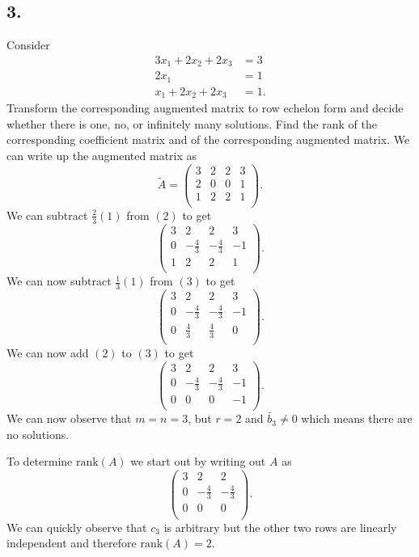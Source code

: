 \subsection*{3.}
Consider
\begin{align*}
  3x_1 + 2x_2 + 2x_3 &= 3 \\
  2x_1 &= 1 \\
  x_1 + 2x_2 + 2x_3 &= 1
.\end{align*}
Transform the corresponding augmented matrix to row echelon form and decide whether there is one, no, or infinitely many solutions. Find the rank of the corresponding coefficient matrix and of the corresponding augmented matrix.
\bigbreak
We can write up the augmented matrix as
\[ 
\tilde{A} = \left( \begin{array}{ccc|c}
3 & 2 & 2 & 3\\
2 & 0 & 0 & 1\\
1 & 2 & 2 & 1\\
\end{array} \right)
.\]
We can subtract $\frac{2}{3}(1)$ from $(2)$ to get
\[ 
\left( \begin{array}{ccc|c}
3 & 2 & 2 & 3\\
0 & -\frac{4}{3} & -\frac{4}{3} & -1\\
1 & 2 & 2 & 1\\
\end{array} \right)
.\]
We can now subtract $\frac{1}{3}(1)$ from $(3)$ to get
\[ 
\left( \begin{array}{ccc|c}
3 & 2 & 2 & 3\\
0 & -\frac{4}{3} & -\frac{4}{3} & -1\\
0 & \frac{4}{3} & \frac{4}{3} & 0\\
\end{array} \right)
.\]
We can now add $(2)$ to $(3)$ to get
\[ 
\left( \begin{array}{ccc|c}
3 & 2 & 2 & 3\\
0 & -\frac{4}{3} & -\frac{4}{3} & -1\\
0 & 0 & 0 & -1\\
\end{array} \right)
.\]
We can now observe that $m = n = 3$, but $r = 2$ and $\tilde{b_3} \neq 0$ which means there are no solutions.

To determine $\mathrm{rank}(A)$ we start out by writing out $A$ as
\[ 
  \begin{pmatrix}
  3 & 2 & 2\\
  0 & -\frac{4}{3} & -\frac{4}{3}\\
  0 & 0 & 0\\
  \end{pmatrix}
.\]
We can quickly observe that $c_3$ is arbitrary but the other two rows are linearly independent and therefore $\mathrm{rank}(A) = 2$.

